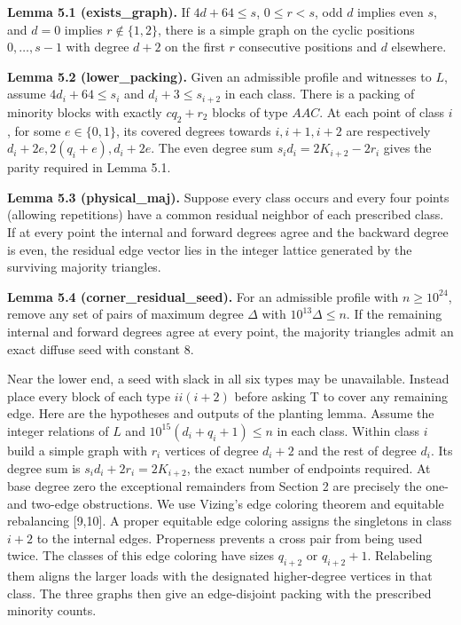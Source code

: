 \documentclass[english,11pt,a4paper]{article}
\begin{document}
\textbf{Lemma 5.1 (exists\_graph).} If \(4d+64\le s\), \(0\le r<s\), odd \(d\) implies even \(s\), and \(d=0\) implies \(r\notin\{1,2\}\), there is a simple graph on the cyclic positions \(0,\ldots,s-1\) with degree \(d+2\) on the first \(r\) consecutive positions and \(d\) elsewhere.

\textbf{Lemma 5.2 (lower\_packing).} Given an admissible profile and witnesses to \(L\), assume \(4d_i+64\le s_i\) and \(d_i+3\le s_{i+2}\) in each class. There is a packing of minority blocks with exactly \(cq_2+r_2\) blocks of type \(AAC\). At each point of class \(i\), for some \(e\in\{0,1\}\), its covered degrees towards \(i,i+1,i+2\) are respectively \(d_i+2e,2(q_i+e),d_i+2e\). The even degree sum \(s_i d_i=2K_{i+2}-2r_i\) gives the parity required in Lemma 5.1.

\textbf{Lemma 5.3 (physical\_maj).} Suppose every class occurs and every four points (allowing repetitions) have a common residual neighbor of each prescribed class. If at every point the internal and forward degrees agree and the backward degree is even, the residual edge vector lies in the integer lattice generated by the surviving majority triangles.

\textbf{Lemma 5.4 (corner\_residual\_seed).} For an admissible profile with \(n\ge10^{24}\), remove any set of pairs of maximum degree \(\Delta\) with \(10^{13}\Delta\le n\). If the remaining internal and forward degrees agree at every point, the majority triangles admit an exact diffuse seed with constant 8.

Near the lower end, a seed with slack in all six types may be unavailable. Instead place every block of each type \(ii(i+2)\) before asking T to cover any remaining edge. Here are the hypotheses and outputs of the planting lemma. Assume the integer relations of \(L\) and \(10^{15}(d_i+q_i+1)\le n\) in each class. Within class \(i\) build a simple graph with \(r_i\) vertices of degree \(d_i+2\) and the rest of degree \(d_i\). Its degree sum is \(s_id_i+2r_i=2K_{i+2}\), the exact number of endpoints required. At base degree zero the exceptional remainders from Section 2 are precisely the one- and two-edge obstructions. We use Vizing's edge coloring theorem and equitable rebalancing {[}9,10{]}. A proper equitable edge coloring assigns the singletons in class \(i+2\) to the internal edges. Properness prevents a cross pair from being used twice. The classes of this edge coloring have sizes \(q_{i+2}\) or \(q_{i+2}+1\). Relabeling them aligns the larger loads with the designated higher-degree vertices in that class. The three graphs then give an edge-disjoint packing with the prescribed minority counts.
\end{document}
